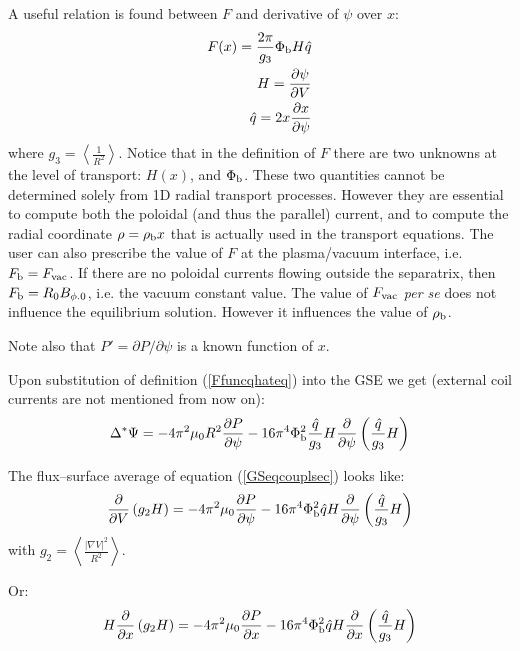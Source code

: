 A useful relation is found between $F$ and derivative of $\psi$ over $x$:
\begin{eqnarray}
F(x) = \frac{2\pi}{g_3} \Phi_{\rm b} H \hat{q} \nonumber \\
H = \frac{\partial\psi}{\partial V} \nonumber \\
\hat{q} = 2x\frac{\partial x}{\partial\psi} 
\label{Ffuncqhateq}
\end{eqnarray}
where $\displaystyle g_3=\left\langle \frac{1}{R^2}\right\rangle$. Notice that in the definition of $F$ 
there are two unknowns at the level of transport: $H(x)$, and $\Phi_{\rm b}$. These two quantities cannot 
be determined solely from 1D radial transport processes. However they are essential to compute both the 
poloidal (and thus the parallel) current, and to compute the radial coordinate $\rho=\rho_{\rm b} x$ that 
is actually used
in the transport equations. The user can also prescribe the value of $F$ at the plasma/vacuum interface, 
i.e. $F_{\rm b}=F_{\rm vac}$. If there are no poloidal currents flowing outside the separatrix, then 
$F_{\rm b}=R_0 B_{\phi.0}$, i.e. the vacuum constant value. The value of $F_{\rm vac}$ {\it per se} does 
not influence the equilibrium solution. However it influences the value of $\rho_{\rm b}$.

Note also that $P'=\partial P/\partial\psi$ is a known function of $x$.

Upon substitution of definition (\ref{Ffuncqhateq}) into the GSE we get (external coil currents are not 
mentioned from now on):
\begin{eqnarray}
\Delta^* \Psi = -4\pi^2 \mu_0 R^2 \frac{\partial P}{\partial\psi} - 16\pi^4 \Phi_{\rm b}^2\frac{\hat{q} }{g_3}  H  \frac{\partial }{\partial\psi} \left(\frac{\hat{q}}{g_3} H \right)
\label{GSeqcouplsec}
\end{eqnarray}

The flux--surface average of equation (\ref{GSeqcouplsec}) looks like:
\begin{eqnarray}
\frac{\partial}{\partial V}\left(g_2 H \right) = -4\pi^2 \mu_0 \frac{\partial P}{\partial\psi} - 16\pi^4 \Phi_{\rm b}^2 \hat{q}  H  \frac{\partial }{\partial\psi} \left(\frac{\hat{q}}{g_3} H \right)
\label{GSeqcouplsecfsa}
\end{eqnarray}
with $\displaystyle g_2=\left\langle \frac{|\nabla V|^2}{R^2}\right\rangle$.

Or:
\begin{eqnarray}
H\frac{\partial}{\partial x}\left(g_2 H \right) = -4\pi^2 \mu_0 \frac{\partial P}{\partial x} - 16\pi^4 \Phi_{\rm b}^2 \hat{q}  H  \frac{\partial }{\partial x} \left(\frac{\hat{q}}{g_3} H \right)
\label{GSeqcouplsecfsax}
\end{eqnarray}

